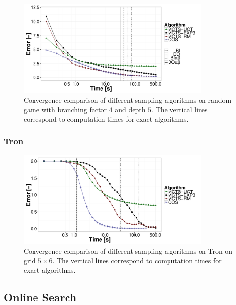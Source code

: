 \begin{figure}
\centering
\includegraphics[width=0.85\textwidth]{figures/convergence-rg.pdf}
\caption{Convergence comparison of different sampling algorithms on random game with branching factor $4$ and depth $5$. The vertical lines correspond to computation times for exact algorithms.} \label{fig:off:conv:rg}
\end{figure}

\subsubsection{Tron}
\begin{figure}
\centering
\includegraphics[width=0.85\textwidth]{figures/convergence-tron.pdf}
\caption{Convergence comparison of different sampling algorithms on Tron on grid $5\times6$. The vertical lines correspond to computation times for exact algorithms.} \label{fig:off:conv:rg}
\end{figure}

\subsection{Online Search}

